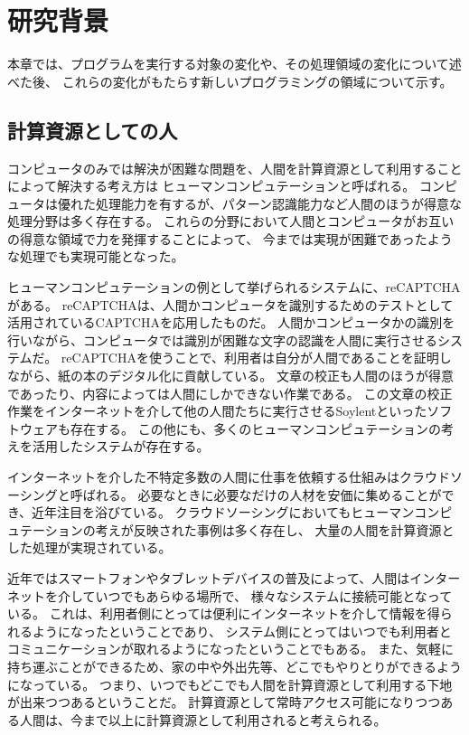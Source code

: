 \chapter{研究背景}\label{chap:background}

本章では、プログラムを実行する対象の変化や、その処理領域の変化について述べた後、
これらの変化がもたらす新しいプログラミングの領域について示す。

\newpage

\section{計算資源としての人}\label{sec:human-as-computational-resouces}

コンピュータのみでは解決が困難な問題を、人間を計算資源として利用することによって解決する考え方は
ヒューマンコンピュテーション\cite{humancomputation}と呼ばれる。
コンピュータは優れた処理能力を有するが、パターン認識能力など人間のほうが得意な処理分野は多く存在する。
これらの分野において人間とコンピュータがお互いの得意な領域で力を発揮することによって、
今までは実現が困難であったような処理でも実現可能となった。

ヒューマンコンピュテーションの例として挙げられるシステムに、reCAPTCHA\cite{recaptcha}がある。
reCAPTCHAは、人間かコンピュータを識別するためのテストとして活用されているCAPTCHA\cite{captcha}を応用したものだ。
人間かコンピュータかの識別を行いながら、コンピュータでは識別が困難な文字の認識を人間に実行させるシステムだ。
reCAPTCHAを使うことで、利用者は自分が人間であることを証明しながら、紙の本のデジタル化に貢献している。
文章の校正も人間のほうが得意であったり、内容によっては人間にしかできない作業である。
この文章の校正作業をインターネットを介して他の人間たちに実行させるSoylent\cite{soylent}といったソフトウェアも存在する。
この他にも、多くのヒューマンコンピュテーションの考えを活用したシステムが存在する。

インターネットを介した不特定多数の人間に仕事を依頼する仕組みはクラウドソーシング\cite{riseofcrowdsourcing}と呼ばれる。
必要なときに必要なだけの人材を安価に集めることができ、近年注目を浴びている。
クラウドソーシングにおいてもヒューマンコンピュテーションの考えが反映された事例は多く存在し、
大量の人間を計算資源とした処理が実現されている。

近年ではスマートフォンやタブレットデバイスの普及によって、人間はインターネットを介していつでもあらゆる場所で、
様々なシステムに接続可能となっている。
これは、利用者側にとっては便利にインターネットを介して情報を得られるようになったということであり、
システム側にとってはいつでも利用者とコミュニケーションが取れるようになったということでもある。
また、気軽に持ち運ぶことができるため、家の中や外出先等、どこでもやりとりができるようになっている。
つまり、いつでもどこでも人間を計算資源として利用する下地が出来つつあるということだ。
計算資源として常時アクセス可能になりつつある人間は、今まで以上に計算資源として利用されると考えられる。

